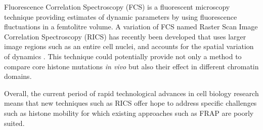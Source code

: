     Fluorescence Correlation Spectroscopy (FCS) is a fluorescent
    microscopy technique providing estimates of dynamic parameters by
    using fluorescence fluctuations in a femtolitre volume.  A
    variation of FCS named Raster Scan Image Correlation Spectroscopy
    (RICS) has recently been developed that uses larger image regions
    such as an entire cell nuclei, and accounts for the spatial
    variation of dynamics \citep{digman2005rics}.  This technique
    could potentially provide not only a method to compare core
    histone mutations \textit{in vivo} but also their effect in
    different chromatin domains.

    Overall, the current period of rapid technological advances in
    cell biology research means that new techniques such as RICS offer
    hope to address specific challenges such as histone mobility for
    which existing approaches such as FRAP are poorly suited.


